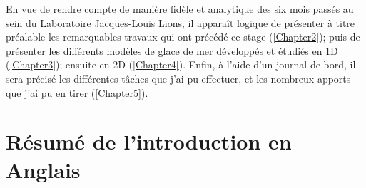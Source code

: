En vue de rendre compte de manière fidèle et analytique des six mois passés au sein du Laboratoire Jacques-Louis Lions, il apparaît logique de présenter à titre préalable les remarquables travaux qui ont précédé ce stage (\cref{Chapter2}); puis de présenter les différents modèles de glace de mer développés et étudiés en 1D (\cref{Chapter3}); ensuite en 2D (\cref{Chapter4}). Enfin, à l'aide d'un journal de bord, il sera précisé les différentes tâches que j’ai pu effectuer, et les nombreux apports que j’ai pu en tirer (\cref{Chapter5}). 









\section{Résumé de l'introduction en Anglais}